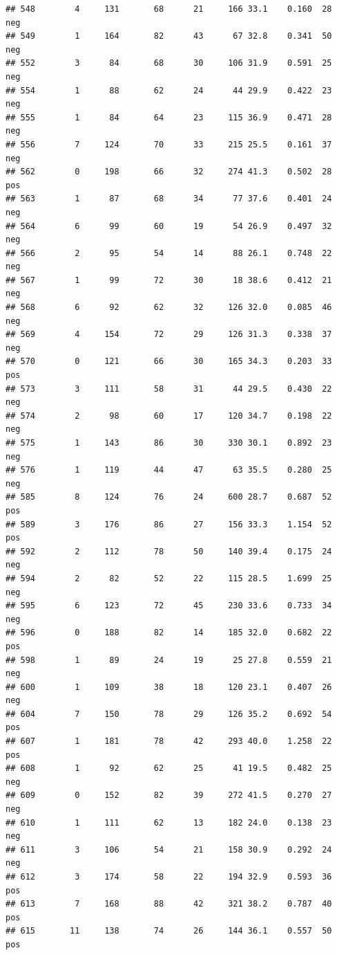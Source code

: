 \documentclass[
]{article}
\begin{document}
\begin{verbatim}
## 548        4     131       68      21     166 33.1    0.160  28      neg
## 549        1     164       82      43      67 32.8    0.341  50      neg
## 552        3      84       68      30     106 31.9    0.591  25      neg
## 554        1      88       62      24      44 29.9    0.422  23      neg
## 555        1      84       64      23     115 36.9    0.471  28      neg
## 556        7     124       70      33     215 25.5    0.161  37      neg
## 562        0     198       66      32     274 41.3    0.502  28      pos
## 563        1      87       68      34      77 37.6    0.401  24      neg
## 564        6      99       60      19      54 26.9    0.497  32      neg
## 566        2      95       54      14      88 26.1    0.748  22      neg
## 567        1      99       72      30      18 38.6    0.412  21      neg
## 568        6      92       62      32     126 32.0    0.085  46      neg
## 569        4     154       72      29     126 31.3    0.338  37      neg
## 570        0     121       66      30     165 34.3    0.203  33      pos
## 573        3     111       58      31      44 29.5    0.430  22      neg
## 574        2      98       60      17     120 34.7    0.198  22      neg
## 575        1     143       86      30     330 30.1    0.892  23      neg
## 576        1     119       44      47      63 35.5    0.280  25      neg
## 585        8     124       76      24     600 28.7    0.687  52      pos
## 589        3     176       86      27     156 33.3    1.154  52      pos
## 592        2     112       78      50     140 39.4    0.175  24      neg
## 594        2      82       52      22     115 28.5    1.699  25      neg
## 595        6     123       72      45     230 33.6    0.733  34      neg
## 596        0     188       82      14     185 32.0    0.682  22      pos
## 598        1      89       24      19      25 27.8    0.559  21      neg
## 600        1     109       38      18     120 23.1    0.407  26      neg
## 604        7     150       78      29     126 35.2    0.692  54      pos
## 607        1     181       78      42     293 40.0    1.258  22      pos
## 608        1      92       62      25      41 19.5    0.482  25      neg
## 609        0     152       82      39     272 41.5    0.270  27      neg
## 610        1     111       62      13     182 24.0    0.138  23      neg
## 611        3     106       54      21     158 30.9    0.292  24      neg
## 612        3     174       58      22     194 32.9    0.593  36      pos
## 613        7     168       88      42     321 38.2    0.787  40      pos
## 615       11     138       74      26     144 36.1    0.557  50      pos

\end{verbatim}
\end{document}
